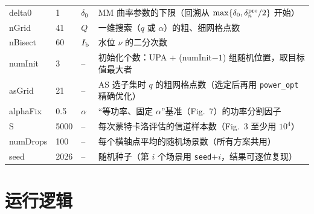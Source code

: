 \documentclass[11pt,a4paper]{ctexart}
\newcommand{\code}[1]{\texttt{#1}}
\begin{document}
\begin{longtable}{>{\ttfamily}p{2.5cm}p{1.6cm}p{2.0cm}p{8.9cm}}
delta0 & 1 & $\delta_0$ & MM 曲率参数的下限（回溯从 $\max\{\delta_0,\delta_n^{\rm pre}/2\}$ 开始）\\
nGrid & 41 & $Q$ & 一维搜索（$q$ 或 $\alpha$）的粗、细网格点数 \\
nBisect & 60 & $I_{\rm b}$ & 水位 $\nu$ 的二分次数 \\
numInit & 3 & -- & 初始化个数：UPA + (numInit$-1$) 组随机位置，取目标值最大者 \\
asGrid & 21 & -- & AS 选子集时 $q$ 的粗网格点数（选定后再用 \code{power\_opt} 精确优化）\\
alphaFix & 0.5 & $\alpha$ & “等功率、固定 $\alpha$”基准（Fig.~7）的功率分割因子 \\ \midrule
S & 5000 & -- & 每次蒙特卡洛评估的信道样本数（Fig.~3 至少用 $10^4$）\\
numDrops & 100 & -- & 每个横轴点平均的随机场景数（所有方案共用）\\
seed & 2026 & -- & 随机种子（第 $i$ 个场景用 \code{seed}$+i$，结果可逐位复现）\\
\bottomrule
\end{longtable}

\section{运行逻辑}
\end{document}
